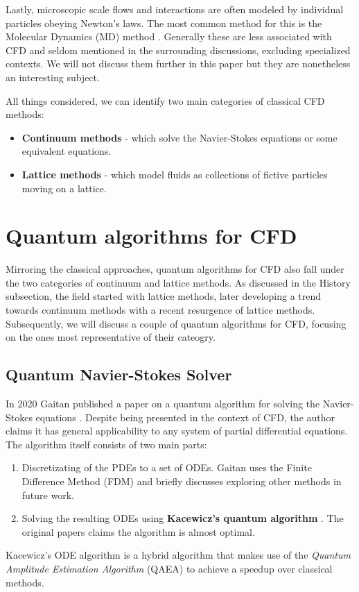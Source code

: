 \documentclass[conference]{IEEEtran}
\begin{document}
Lastly, microscopic scale flows and interactions are often modeled by individual particles obeying Newton's laws. The most common method for this is the Molecular Dynamics (MD) method \cite{koplik1989molecular}.
Generally these are less associated with CFD and seldom mentioned in the surrounding discussions, excluding specialized contexts.
We will not discuss them further in this paper but they are nonetheless an interesting subject.

All things considered, we can identify two main categories of classical CFD methods:
\begin{itemize}
    \item \textbf{Continuum methods} - which solve the Navier-Stokes equations or some equivalent equations.
    \item \textbf{Lattice methods} - which model fluids as collections of fictive particles moving on a lattice.
\end{itemize}

\section{Quantum algorithms for CFD}

Mirroring the classical approaches, quantum algorithms for CFD also fall under the two categories of continuum and lattice methods.
As discussed in the History subsection, the field started with lattice methods, later developing a trend towards continuum methods with a recent resurgence of lattice methods.
Subsequently, we will discuss a couple of quantum algorithms for CFD, focusing on the ones most representative of their cateogry.

\subsection{Quantum Navier-Stokes Solver}
In 2020 Gaitan published a paper on a quantum algorithm for solving the Navier-Stokes equations \cite{gaitan2020finding}.
Despite being presented in the context of CFD, the author claims it has general applicability to any system of partial differential equations.
The algorithm itself consists of two main parts:
\begin{enumerate}
    \item Discretizating of the PDEs to a set of ODEs. Gaitan uses the Finite Difference Method (FDM) and briefly discusses exploring other methods in future work.
    \item Solving the resulting ODEs using \textbf{Kacewicz's quantum algorithm} \cite{kacewicz2006almost}. The original papers claims the algorithm is almost optimal.
\end{enumerate}
Kacewicz's ODE algorithm is a hybrid algorithm that makes use of the \emph{Quantum Amplitude Estimation Algorithm} (QAEA) \cite{brassard2002quantum} to achieve a speedup over classical methods.
\end{document}
